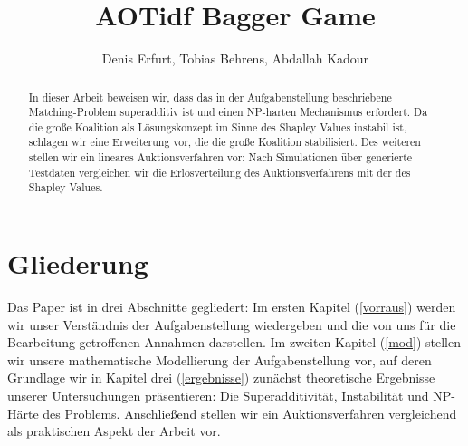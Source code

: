 \documentclass[sigconf]{acmart}
\theoremstyle{break}
\begin{document}
\title{AOTidf Bagger Game}
\author{Denis Erfurt, Tobias Behrens, Abdallah Kadour}

\begin{abstract}
  \noindent
  In dieser Arbeit beweisen wir, dass das in der Aufgabenstellung beschriebene Matching-Problem superadditiv ist und einen NP-harten Mechanismus erfordert. Da die große Koalition als Lösungskonzept im Sinne des Shapley Values instabil ist, schlagen wir eine Erweiterung vor, die die große Koalition stabilisiert. Des weiteren stellen wir ein lineares Auktionsverfahren vor: Nach Simulationen über generierte Testdaten vergleichen wir die Erlösverteilung des Auktionsverfahrens mit der des Shapley Values.
\end{abstract}

\maketitle

\section{Gliederung}
Das Paper ist in drei Abschnitte gegliedert: Im ersten Kapitel (\ref{vorraus}) werden wir unser Verständnis der Aufgabenstellung wiedergeben und die von uns für die Bearbeitung getroffenen Annahmen darstellen. Im zweiten Kapitel (\ref{mod}) stellen wir unsere mathematische Modellierung der Aufgabenstellung vor, auf deren Grundlage wir in Kapitel drei (\ref{ergebnisse}) zunächst theoretische Ergebnisse unserer Untersuchungen präsentieren: Die Superadditivität, Instabilität und NP-Härte des Problems. Anschließend stellen wir ein Auktionsverfahren vergleichend als praktischen Aspekt der Arbeit vor. 
\end{document}
